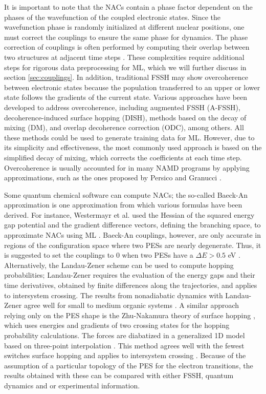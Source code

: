 \documentclass[9pt,bestpractices]{livecoms}
\begin{document}
It is important to note that the NACs contain a phase factor dependent on the phases of the wavefunction of the coupled electronic states. Since the wavefunction phase is randomly initialized at different nuclear positions, one must correct the couplings to ensure the same phase for dynamics. The phase correction of couplings is often performed by computing their overlap between two structures at adjacent time steps \cite{RN132, RN113}. These complexities require additional steps for rigorous data preprocessing for ML, which we will further discuss in section \ref{sec:couplings}. In addition, traditional FSSH may show overcoherence between electronic states because the population transferred to an upper or lower state follows the gradients of the current state. Various approaches have been developed to address overcoherence, including augmented FSSH (A-FSSH), decoherence-induced surface hopping (DISH), methods based on the decay of mixing (DM), and overlap decoherence correction (ODC), among others. All these methods could be used to generate training data for ML. However, due to its simplicity and effectiveness, the most commonly used approach is based on the simplified decay of mixing, which corrects the coefficients at each time step. Overcoherence is usually accounted for in many NAMD programs by applying approximations, such as the ones proposed by Persico and Granucci \cite{RN139, RN157, RN83, RN125}.

Some quantum chemical software can compute NACs; the so-called Baeck-An approximation \cite{RN79, RN80} is one approximation from which various formulas have been derived. For instance, Westermayr et al. used the Hessian of the squared energy gap potential and the gradient difference vectors, defining the branching space, to approximate NACs using ML \cite{RN103, RN104, RN78}. Baeck-An couplings, however, are only accurate in regions of the configuration space where two PESs are nearly degenerate. Thus, it is suggested to set the couplings to 0 when two PESs have a $\Delta E>0.5$ eV \cite{RN81, RN113}. Alternatively, the Landau-Zener scheme can be used to compute hopping probabilities; Landau-Zener requires the evaluation of the energy gaps and their time derivatives, obtained by finite differences along the trajectories, and applies to intersystem crossing. The results from nonadiabatic dynamics with Landau-Zener agree well for small to medium organic systems \cite{RN77}. A similar approach relying only on the PES shape is the Zhu-Nakamura theory of surface hopping \cite{RN76}, which uses energies and gradients of two crossing states for the hopping probability calculations. The forces are diabatized in a generalized 1D model based on three-point interpolation \cite{RN75}. This method agrees well with the fewest switches surface hopping and applies to intersystem crossing \cite{RN75, RN74, RN73, RN72}. Because of the assumption of a particular topology of the PES for the electron transitions, the results obtained with these can be compared with either FSSH, quantum dynamics and or experimental information.  
\end{document}
